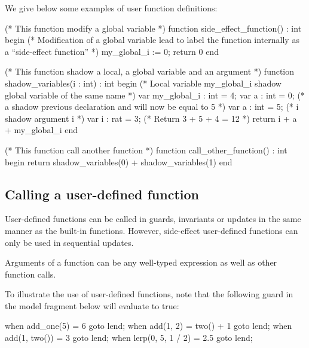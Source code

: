 \begin{example}
We give below some examples of user function definitions:

\begin{IMITATORmodel}

	(* This function modify a global variable *)
	function side_effect_function() : int
	begin
		(* Modification of a global variable lead to label the function internally as a ``side-effect function'' *)
		my_global_i := 0;
		return 0
	end

	(* This function shadow a local, a global variable and an argument *)
	function shadow_variables(i : int) : int
	begin
		(* Local variable my_global_i shadow global variable of the same name *)
		var my_global_i : int = 4;
		var a : int = 0;
		(* a shadow previous declaration and will now be equal to 5 *)
		var a : int = 5;
		(* i shadow argument i *)
		var i : rat = 3;
		(* Return 3 + 5 + 4 = 12 *)
		return i + a + my_global_i
	end

	(* This function call another function *)
	function call_other_function() : int
	begin
		return shadow_variables(0) + shadow_variables(1)
	end

\end{IMITATORmodel}
\end{example}

\subsection{Calling a user-defined function}

User-defined functions can be called in guards, invariants or updates in the same manner as the built-in functions.
However, side-effect user-defined functions can only be used in sequential updates.

Arguments of a function can be any well-typed expression as well as other function calls.

\begin{example}
To illustrate the use of user-defined functions, note that the following guard in the model fragment below will evaluate to true:

\begin{IMITATORmodel}
	when add_one(5) = 6 goto lend;
	when add(1, 2) = two() + 1 goto lend;
	when add(1, two()) = 3 goto lend;
	when lerp(0, 5, 1 / 2) = 2.5 goto lend;
\end{IMITATORmodel}
\end{example}

